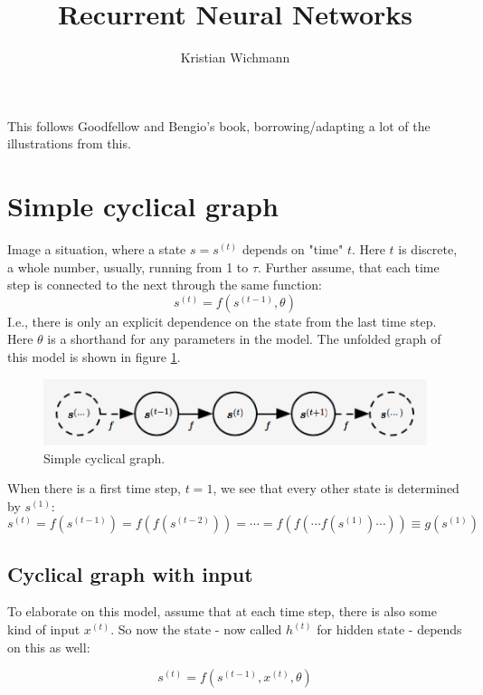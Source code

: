 \documentclass[12pt, a4paper]{article}
\title{Recurrent Neural Networks}
\author{Kristian Wichmann}
\numberwithin{equation}{section}
\begin{document}
\maketitle

This follows Goodfellow and Bengio's book, borrowing/adapting a lot of the illustrations from this.

\section{Simple cyclical graph}

Image a situation, where a state $s=s^{(t)}$ depends on "time" $t$. Here $t$ is discrete, a whole number, usually, running from 1 to $\tau$. Further assume, that each time step is connected to the next through the same function:
\begin{equation}
s^{(t)}=f(s^{(t-1)},\theta)
\end{equation}
I.e., there is only an explicit dependence on the state from the last time step. Here $\theta$ is a shorthand for any parameters in the model. The unfolded graph of this model is shown in figure \ref{fig:cyclical_graph}.

\begin{figure}
\centering
\includegraphics[width=\textwidth]{cyclical_graph}
\caption{Simple cyclical graph.}
\label{fig:cyclical_graph}
\end{figure}

When there is a first time step, $t=1$, we see that every other state is determined by $s^{(1)}$:
\begin{equation}
s^{(t)}=f(s^{(t-1)})=f(f(s^{(t-2)}))=\cdots=f(f(\cdots f(s^{(1)})\cdots))\equiv g(s^{(1)})
\label{explicit_s1_dependence}
\end{equation}

\subsection{Cyclical graph with input}
To elaborate on this model, assume that at each time step, there is also some kind of input $x^{(t)}$. So now the state - now called $h^{(t)}$ for hidden state - depends on this as well:

\begin{equation}
s^{(t)}=f(s^{(t-1)}, x^{(t)},\theta)
\end{equation}
\end{document}
